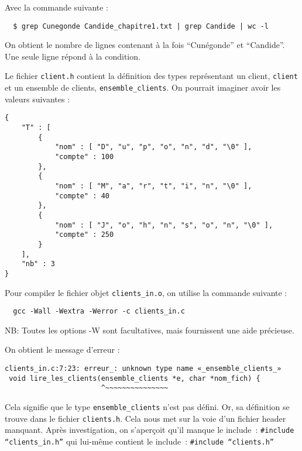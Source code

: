 \documentclass[10pt]{article}
\begin{document}
\begin{enumerate}[label=\textbf{[\alph*]}]
\item Avec la commande suivante :

\begin{verbatim}
  $ grep Cunegonde Candide_chapitre1.txt | grep Candide | wc -l
\end{verbatim}

  On obtient le nombre de lignes contenant à la fois ``Cunégonde'' et
  ``Candide''. Une seule ligne répond à la condition.

\item Le fichier \texttt{client.h} contient la définition des types
  représentant un client, \texttt{client} et un ensemble de clients,
  \texttt{ensemble\_clients}. On pourrait imaginer avoir les valeurs
  suivantes :

\begin{verbatim}
{
    "T" : [
        {
            "nom" : [ "D", "u", "p", "o", "n", "d", "\0" ],
            "compte" : 100
        },
        {
            "nom" : [ "M", "a", "r", "t", "i", "n", "\0" ],
            "compte" : 40
        },
        {
            "nom" : [ "J", "o", "h", "n", "s", "o", "n", "\0" ],
            "compte" : 250
        }
    ],
    "nb" : 3
}
\end{verbatim}

\item Pour compiler le fichier objet \texttt{clients\_in.o}, on
  utilise la commande suivante :

\begin{verbatim}
  gcc -Wall -Wextra -Werror -c clients_in.c
\end{verbatim}

  NB: Toutes les options -W sont facultatives, mais fournissent une
  aide précieuse.

  On obtient le message d'erreur :

\begin{verbatim}
clients_in.c:7:23: erreur_: unknown type name «_ensemble_clients_»
 void lire_les_clients(ensemble_clients *e, char *nom_fich) {
                       ^~~~~~~~~~~~~~~~
\end{verbatim}

  Cela signifie que le type \texttt{ensemble\_clients} n'est pas
  défini. Or, sa définition se trouve dans le fichier
  \texttt{clients.h}. Cela nous met sur la voie d'un fichier header
  manquant. Après investigation, on s'aperçoit qu'il manque le
  include~: \texttt{\#include ``clients\_in.h''} qui lui-même contient
  le include~: \texttt{\#include ``clients.h''}


\end{enumerate}
\end{document}
